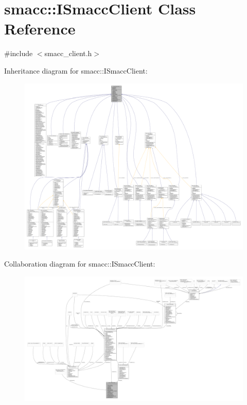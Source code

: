 \hypertarget{classsmacc_1_1ISmaccClient}{}\section{smacc\+:\+:I\+Smacc\+Client Class Reference}
\label{classsmacc_1_1ISmaccClient}


{\ttfamily \#include $<$smacc\+\_\+client.\+h$>$}



Inheritance diagram for smacc\+:\+:I\+Smacc\+Client\+:
\nopagebreak
\begin{figure}[H]
\begin{center}
\leavevmode
\includegraphics[width=350pt]{classsmacc_1_1ISmaccClient__inherit__graph}
\end{center}
\end{figure}


Collaboration diagram for smacc\+:\+:I\+Smacc\+Client\+:
\nopagebreak
\begin{figure}[H]
\begin{center}
\leavevmode
\includegraphics[width=350pt]{classsmacc_1_1ISmaccClient__coll__graph}
\end{center}
\end{figure}
